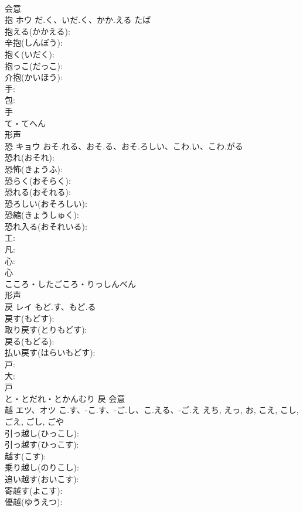 \documentclass[8pt]{extreport}
\begin{document}
\begin{CJK}{UTF8}{min}
\\	会意 
\\	抱	ホウ	だ.く、いだ.く、かか.える	たば	
\\	抱える(かかえる): 
\\	辛抱(しんぼう): 
\\	抱く(いだく): 
\\	抱っこ(だっこ): 
\\	介抱(かいほう): 
\\	手: 
\\	包: 
\\	手	
\\	て・てへん	
\\	形声 
\\	恐	キョウ	おそ.れる、おそ.る、おそ.ろしい、こわ.い、こわ.がる		
\\	恐れ(おそれ): 
\\	恐怖(きょうふ): 
\\	恐らく(おそらく): 
\\	恐れる(おそれる): 
\\	恐ろしい(おそろしい): 
\\	恐縮(きょうしゅく): 
\\	恐れ入る(おそれいる): 
\\	工: 
\\	凡: 
\\	心: 
\\	心	
\\	こころ・したごころ・りっしんべん	
\\	形声 
\\	戻	レイ	もど.す、もど.る		
\\	戻す(もどす): 
\\	取り戻す(とりもどす): 
\\	戻る(もどる): 
\\	払い戻す(はらいもどす): 
\\	戸: 
\\	大: 
\\	戸	
\\	と・とだれ・とかんむり	戾	会意 
\\	越	エツ、オツ	こ.す、-こ.す、-ご.し、こ.える、-ご.え	えち, えっ, お, こえ, こし, ごえ, ごし, ごや	
\\	引っ越し(ひっこし): 
\\	引っ越す(ひっこす): 
\\	越す(こす): 
\\	乗り越し(のりこし): 
\\	追い越す(おいこす): 
\\	寄越す(よこす): 
\\	優越(ゆうえつ): 

\end{CJK}
\end{document}
